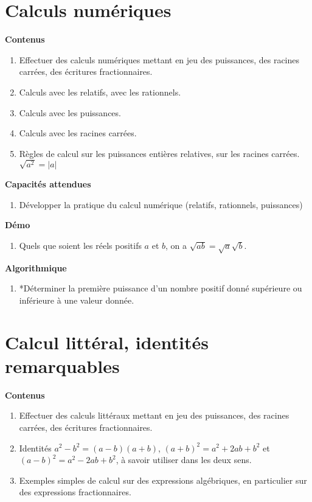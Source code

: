 \documentclass[10pt,a4paper]{article}
\begin{document}
\section{Calculs numériques}

\textbf{Contenus}

\begin{enumerate}
\item Effectuer des calculs numériques mettant en jeu des puissances, des racines carrées, des écritures fractionnaires.
\item Calculs avec les relatifs, avec les rationnels.
\item Calculs avec les puissances.
\item Calculs avec les racines carrées.
\item Règles de calcul sur les puissances entières relatives, sur les racines carrées. $\sqrt {a^2} = |a|$ 
\end{enumerate}

\textbf{Capacités attendues}

\begin{enumerate}
\item Développer la pratique du calcul numérique (relatifs, rationnels, puissances)
\end{enumerate}


\textbf{Démo}

\begin{enumerate}
\item   Quels que soient les réels positifs $a$ et $b$, on a $\sqrt{ab} = \sqrt a  \sqrt b$.
\end{enumerate}



\textbf{Algorithmique}

\begin{enumerate}
\item *Déterminer la première puissance d'un nombre positif donné supérieure ou inférieure à une valeur donnée.
\end{enumerate}



\section{Calcul littéral, identités remarquables}

\textbf{Contenus}

\begin{enumerate}
\item Effectuer des calculs littéraux mettant en jeu des puissances, des racines carrées, des écritures fractionnaires.
\item Identités $a^2-b^2=(a-b)(a+b)$, $(a + b)^2= a^2+ 2ab + b^2$ et $(a - b)^2= a^2- 2ab + b^2$, à savoir utiliser dans les deux sens.
\item Exemples simples de calcul sur des expressions algébriques, en particulier sur des expressions fractionnaires.
\end{enumerate}
\end{document}
